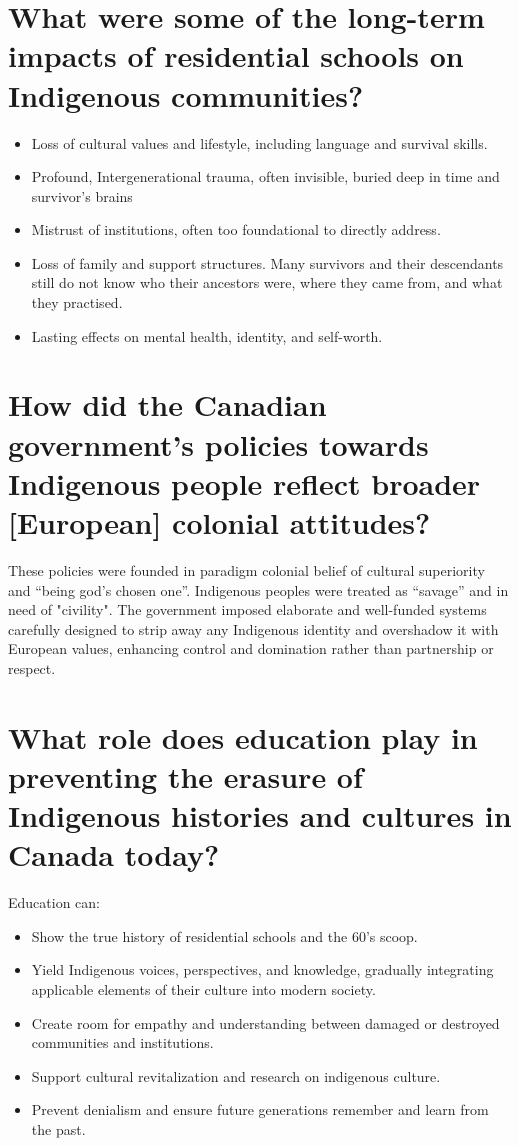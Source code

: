 \documentclass{article}
\begin{document}
\section{What were some of the long-term impacts of residential schools on Indigenous communities?}
\begin{itemize}
    \item Loss of cultural values and lifestyle, including language and survival skills.
    \item Profound, Intergenerational trauma, often invisible, buried deep in time and survivor’s brains
    \item Mistrust of institutions, often too foundational to directly address.
    \item Loss of family and support structures. Many survivors and their descendants still do not know who their ancestors were, where they came from, and what they practised.
    \item Lasting effects on mental health, identity, and self-worth.
\end{itemize}

\section{How did the Canadian government’s policies towards Indigenous people reflect broader [European] colonial attitudes?}
These policies were founded in paradigm colonial belief of cultural superiority and “being god’s chosen one”. Indigenous peoples were treated as “savage” and in need of "civility". The government imposed elaborate and well-funded systems carefully designed to strip away any Indigenous identity and overshadow it with European values, enhancing control and domination rather than partnership or respect.

\section{What role does education play in preventing the erasure of Indigenous histories and cultures in Canada today?}
Education can:
\begin{itemize}
    \item Show the true history of residential schools and the 60’s scoop.
    \item Yield Indigenous voices, perspectives, and knowledge, gradually integrating applicable elements of their culture into modern society.
    \item Create room for empathy and understanding between damaged or destroyed communities and institutions.
    \item Support cultural revitalization and research on indigenous culture.
    \item Prevent denialism and ensure future generations remember and learn from the past.
\end{itemize}
\end{document}
